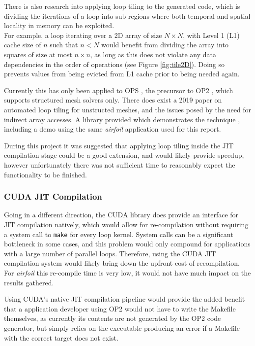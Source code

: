 \noindent There is also research into applying loop tiling to the generated code, which is dividing the iterations of a loop into sub-regions where both temporal and spatial locality in memory can be exploited.\\
For example, a loop iterating over a 2D array of size $N \times N$, with Level 1 (L1) cache size of $n$ such that $n < N$ would benefit from dividing the array into squares of size at most $n \times n$, as long as this does not violate any data dependencies in the order of operations (see Figure \ref{fig:tile2D}). Doing so prevents values from being evicted from L1 cache prior to being needed again.
\par
Currently this has only been applied to OPS \cite{opstiling}, the precursor to OP2 \cite{opsmain}, which supports structured mesh solvers only. There does exist a 2019 paper \cite{slope} on automated loop tiling for unstructed meshes, and the issues posed by the need for indirect array accesses. A library provided which demonstrates the technique \cite{SLOPErep}, including a demo using the same \textit{airfoil} application used for this report.
\par
During this project it was suggested that applying loop tiling inside the JIT compilation stage could be a good extension, and would likely provide speedup, however unfortunately there was not sufficient time to reasonably expect the functionality to be finished.

\subsubsection{CUDA JIT Compilation}
Going in a different direction, the CUDA library does provide an interface for JIT compilation natively, which would allow for re-compilation without requiring a system call to \verb|make| for every loop kernel. System calls can be a significant bottleneck in some cases, and this problem would only compound for applications with a large number of parallel loops. Therefore, using the CUDA JIT compilation system would likely bring down the upfront cost of recompilation. For \textit{airfoil} this re-compile time is very low, it would not have much impact on the results gathered.
\par
Using CUDA's native JIT compilation pipeline would provide the added benefit that a application developer using OP2 would not have to write the Makefile themselves, as currently its contents are not generated by the OP2 code generator, but simply relies on the executable producing an error if a Makefile with the correct target does not exist.

